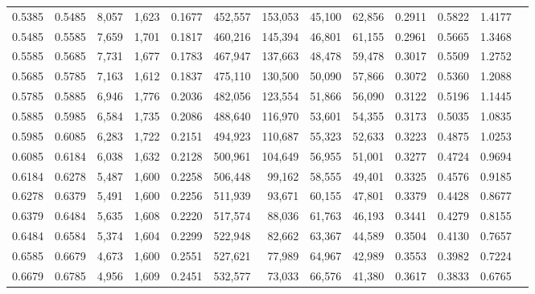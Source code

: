 \begin{tabular}{rrrrrrrrrrrrr}
0.5385 & 0.5485 &  8,057 & 1,623 &                                     0.1677 & 452,557 & 153,053 &  45,100 &  62,856 & 0.2911 & 0.5822 & 1.4177 \\
0.5485 & 0.5585 &  7,659 & 1,701 &                                     0.1817 & 460,216 & 145,394 &  46,801 &  61,155 & 0.2961 & 0.5665 & 1.3468 \\
0.5585 & 0.5685 &  7,731 & 1,677 &                                     0.1783 & 467,947 & 137,663 &  48,478 &  59,478 & 0.3017 & 0.5509 & 1.2752 \\
0.5685 & 0.5785 &  7,163 & 1,612 &                                     0.1837 & 475,110 & 130,500 &  50,090 &  57,866 & 0.3072 & 0.5360 & 1.2088 \\
0.5785 & 0.5885 &  6,946 & 1,776 &                                     0.2036 & 482,056 & 123,554 &  51,866 &  56,090 & 0.3122 & 0.5196 & 1.1445 \\
0.5885 & 0.5985 &  6,584 & 1,735 &                                     0.2086 & 488,640 & 116,970 &  53,601 &  54,355 & 0.3173 & 0.5035 & 1.0835 \\
0.5985 & 0.6085 &  6,283 & 1,722 &                                     0.2151 & 494,923 & 110,687 &  55,323 &  52,633 & 0.3223 & 0.4875 & 1.0253 \\
0.6085 & 0.6184 &  6,038 & 1,632 &                                     0.2128 & 500,961 & 104,649 &  56,955 &  51,001 & 0.3277 & 0.4724 & 0.9694 \\
0.6184 & 0.6278 &  5,487 & 1,600 &                                     0.2258 & 506,448 &  99,162 &  58,555 &  49,401 & 0.3325 & 0.4576 & 0.9185 \\
0.6278 & 0.6379 &  5,491 & 1,600 &                                     0.2256 & 511,939 &  93,671 &  60,155 &  47,801 & 0.3379 & 0.4428 & 0.8677 \\
0.6379 & 0.6484 &  5,635 & 1,608 &                                     0.2220 & 517,574 &  88,036 &  61,763 &  46,193 & 0.3441 & 0.4279 & 0.8155 \\
0.6484 & 0.6584 &  5,374 & 1,604 &                                     0.2299 & 522,948 &  82,662 &  63,367 &  44,589 & 0.3504 & 0.4130 & 0.7657 \\
0.6585 & 0.6679 &  4,673 & 1,600 &                                     0.2551 & 527,621 &  77,989 &  64,967 &  42,989 & 0.3553 & 0.3982 & 0.7224 \\
0.6679 & 0.6785 &  4,956 & 1,609 &                                     0.2451 & 532,577 &  73,033 &  66,576 &  41,380 & 0.3617 & 0.3833 & 0.6765 \\

\end{tabular}
